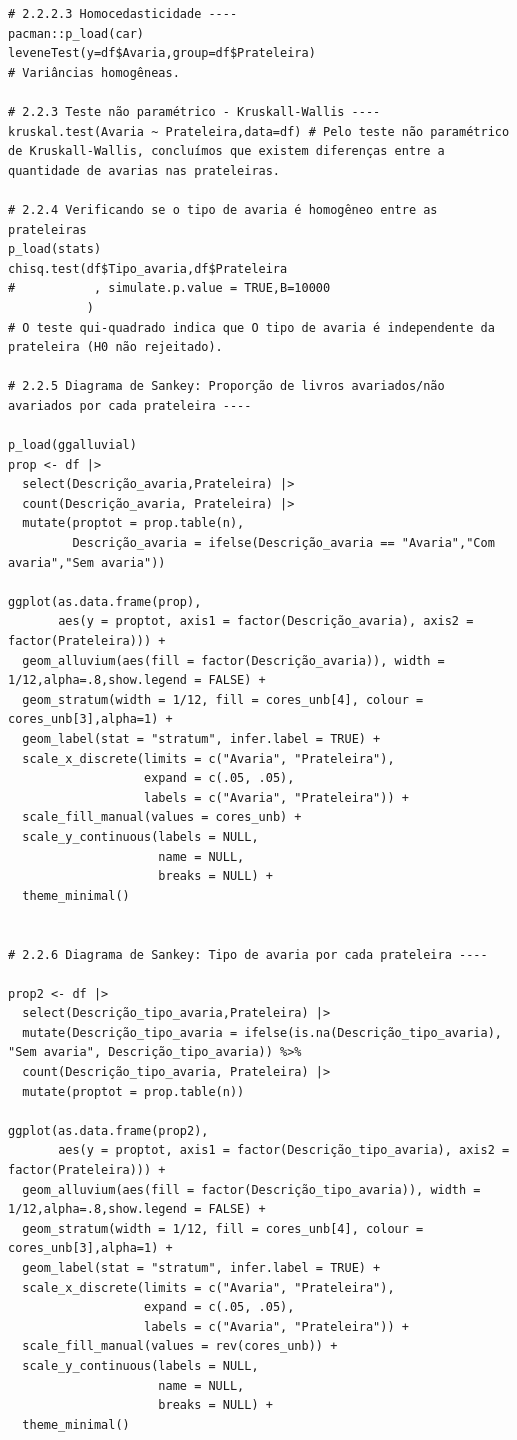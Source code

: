 \documentclass[a4paper, 12pt]{article}
\begin{document}
\begin{lstlisting}
# 2.2.2.3 Homocedasticidade ----
pacman::p_load(car)
leveneTest(y=df$Avaria,group=df$Prateleira)
# Variâncias homogêneas.

# 2.2.3 Teste não paramétrico - Kruskall-Wallis ----
kruskal.test(Avaria ~ Prateleira,data=df) # Pelo teste não paramétrico de Kruskall-Wallis, concluímos que existem diferenças entre a quantidade de avarias nas prateleiras.

# 2.2.4 Verificando se o tipo de avaria é homogêneo entre as prateleiras
p_load(stats)
chisq.test(df$Tipo_avaria,df$Prateleira
#           , simulate.p.value = TRUE,B=10000
           )
# O teste qui-quadrado indica que O tipo de avaria é independente da prateleira (H0 não rejeitado).

# 2.2.5 Diagrama de Sankey: Proporção de livros avariados/não avariados por cada prateleira ----

p_load(ggalluvial)
prop <- df |>
  select(Descrição_avaria,Prateleira) |>
  count(Descrição_avaria, Prateleira) |>
  mutate(proptot = prop.table(n),
         Descrição_avaria = ifelse(Descrição_avaria == "Avaria","Com avaria","Sem avaria"))

ggplot(as.data.frame(prop),
       aes(y = proptot, axis1 = factor(Descrição_avaria), axis2 = factor(Prateleira))) +
  geom_alluvium(aes(fill = factor(Descrição_avaria)), width = 1/12,alpha=.8,show.legend = FALSE) +
  geom_stratum(width = 1/12, fill = cores_unb[4], colour = cores_unb[3],alpha=1) +
  geom_label(stat = "stratum", infer.label = TRUE) +
  scale_x_discrete(limits = c("Avaria", "Prateleira"),
                   expand = c(.05, .05),
                   labels = c("Avaria", "Prateleira")) +
  scale_fill_manual(values = cores_unb) +
  scale_y_continuous(labels = NULL,
                     name = NULL,
                     breaks = NULL) +
  theme_minimal()


# 2.2.6 Diagrama de Sankey: Tipo de avaria por cada prateleira ----

prop2 <- df |>
  select(Descrição_tipo_avaria,Prateleira) |>
  mutate(Descrição_tipo_avaria = ifelse(is.na(Descrição_tipo_avaria), "Sem avaria", Descrição_tipo_avaria)) %>%
  count(Descrição_tipo_avaria, Prateleira) |>
  mutate(proptot = prop.table(n))

ggplot(as.data.frame(prop2),
       aes(y = proptot, axis1 = factor(Descrição_tipo_avaria), axis2 = factor(Prateleira))) +
  geom_alluvium(aes(fill = factor(Descrição_tipo_avaria)), width = 1/12,alpha=.8,show.legend = FALSE) +
  geom_stratum(width = 1/12, fill = cores_unb[4], colour = cores_unb[3],alpha=1) +
  geom_label(stat = "stratum", infer.label = TRUE) +
  scale_x_discrete(limits = c("Avaria", "Prateleira"),
                   expand = c(.05, .05),
                   labels = c("Avaria", "Prateleira")) +
  scale_fill_manual(values = rev(cores_unb)) +
  scale_y_continuous(labels = NULL,
                     name = NULL,
                     breaks = NULL) +
  theme_minimal()

\end{lstlisting}


\newpage

\printbibliography 
\end{document}
